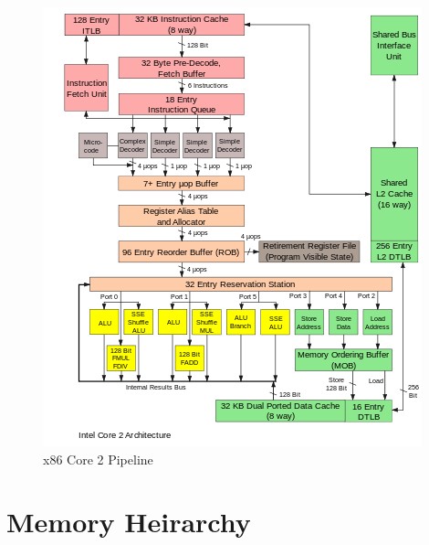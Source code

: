 \documentclass[10pt]{article}
\begin{document}
\par
\begin{figure}[h]
   \centering
   \includegraphics[scale=0.5]{IA_pipeline}
   \caption{x86 Core 2 Pipeline}
\end{figure}
\par

\section{Memory Heirarchy}
\end{document}
